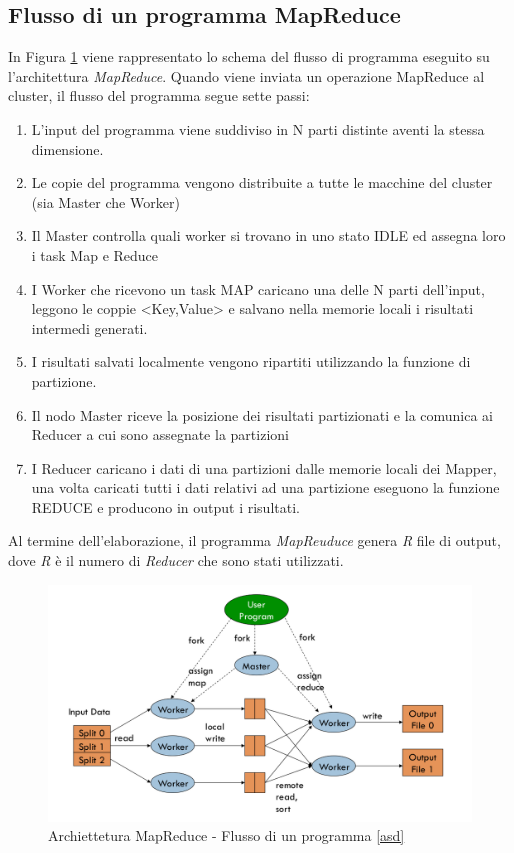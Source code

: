 \documentclass[LaM,binding=0.6cm]{sapthesis}
\begin{document}
\subsection{Flusso di un programma MapReduce}

In Figura \ref{fig:strutMR} viene rappresentato lo schema del flusso di programma eseguito su l'architettura \textit{MapReduce}. Quando viene inviata un operazione MapReduce al cluster, il flusso del programma segue sette passi:

\begin{enumerate}
\item L’input del programma viene suddiviso in N parti distinte aventi la stessa dimensione.
\item Le copie del programma vengono distribuite a tutte le macchine del cluster (sia Master che Worker)
\item Il Master controlla quali worker si trovano in uno stato IDLE ed assegna loro i task Map e Reduce
\item I Worker che ricevono un task MAP caricano una delle N parti dell'input, leggono le coppie <Key,Value> e salvano nella memorie locali i risultati intermedi generati.
\item I risultati salvati localmente vengono ripartiti utilizzando la funzione di partizione.
\item Il nodo Master riceve la posizione dei risultati partizionati e la comunica ai Reducer a cui sono assegnate la partizioni
\item I Reducer caricano i dati di una partizioni dalle memorie locali dei Mapper, una volta caricati tutti i dati relativi ad una partizione eseguono la funzione REDUCE e producono in output i risultati.
\end{enumerate}
Al termine dell'elaborazione, il programma \textit{MapReuduce} genera \textit{R} file di output, dove \textit{R} è il numero di \textit{Reducer} che sono stati utilizzati.


\begin{figure}
\centering
\includegraphics[width=1\textwidth]{esempio_architettura} 
\caption{Archiettetura MapReduce - Flusso di un programma \ref{asd}}%
\label{fig:strutMR}
\end{figure}
\end{document}
